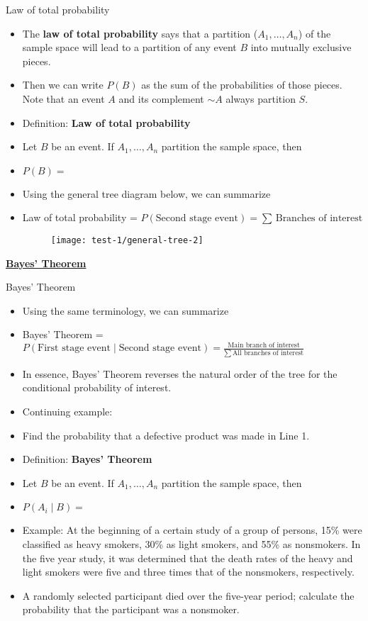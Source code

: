 \documentclass{article}
\newcommand{\bu}[1]{\textbf{\ul{#1}}}				%
\newcommand{\comp}{{\sim}}						%
\newcommand{\vecn}[2]{#1_1, \ldots, #1_{#2}}		%
\begin{document}
Law of total probability\bigskip
\begin{itemize}
     \item The \textbf{law of total probability} says that a partition ($\vecn{A}{n}$) of the sample space will lead to a partition of any event $B$ into mutually exclusive pieces.\vspace{45pt}
    \item[] Then we can write $P(B)$ as the sum of the probabilities of those pieces. Note that an event $A$ and its complement $\comp{A}$ always partition $S$.
    \item Definition: \textbf{Law of total probability}
    \item[] Let $B$ be an event. If $\vecn{A}{n}$ partition the sample space, then\bigskip
    \item[] $P(B) =$ \vspace{85pt}
    \item Using the general tree diagram below, we can summarize
    \item[] Law of total probability = $P(\text{Second stage event}) = \sum \, \text{Branches of interest}$
    \begin{figure}[H]
        \center\texttt{[image: test-1/general-tree-2]}
    \end{figure}
\end{itemize}

\bu{Bayes' Theorem}\bigskip

Bayes' Theorem\bigskip
\begin{itemize}
    \item Using the same terminology, we can summarize
    \item[] Bayes' Theorem = $ P(\text{First stage event} \mid \text{Second stage event}) = \frac{\text{Main branch of interest}}{\sum \, \text{All branches of interest}}$
    \item In essence, Bayes' Theorem reverses the natural order of the tree for the conditional probability of interest.
    \item Continuing example:
    \item[] Find the probability that a defective product was made in Line 1.\vspace{100pt}
    \item Definition: \textbf{Bayes' Theorem}
    \item[] Let $B$ be an event. If $\vecn{A}{n}$ partition the sample space, then\bigskip
    \item[] $P(A_i \mid B) =$\vspace{50pt}
    \item Example: At the beginning of a certain study of a group of persons, 15\% were classified as heavy smokers, 30\% as light smokers, and 55\% as nonsmokers. In the five year study, it was determined that the death rates of the heavy and light smokers were five and three times that of the nonsmokers, respectively.
    \item[] A randomly selected participant died over the five-year period; calculate the probability that the participant was a nonsmoker.\vspace{100pt}
\end{itemize}\bigskip
\end{document}
